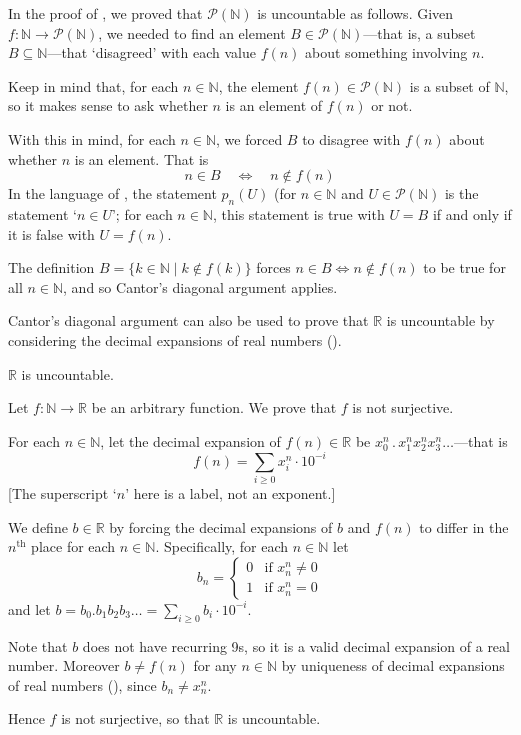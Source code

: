 \begin{example}
In the proof of , we proved that $\mathcal{P}(\mathbb{N})$ is uncountable as follows. Given $f : \mathbb{N} \to \mathcal{P}(\mathbb{N})$, we needed to find an element $B \in \mathcal{P}(\mathbb{N})$---that is, a subset $B \subseteq \mathbb{N}$---that `disagreed' with each value $f(n)$ about something involving $n$.

Keep in mind that, for each $n \in \mathbb{N}$, the element $f(n) \in \mathcal{P}(\mathbb{N})$ is a subset of $\mathbb{N}$, so it makes sense to ask whether $n$ is an element of $f(n)$ or not.

With this in mind, for each $n \in \mathbb{N}$, we forced $B$ to disagree with $f(n)$ about whether $n$ is an element. That is
\[ n \in B \quad \Leftrightarrow \quad n \not\in f(n) \]
In the language of , the statement $p_n(U)$ (for $n \in \mathbb{N}$ and $U \in \mathcal{P}(\mathbb{N})$ is the statement `$n \in U$'; for each $n \in \mathbb{N}$, this statement is true with $U=B$ if and only if it is false with $U=f(n)$.

The definition $B = \{ k \in \mathbb{N} \mid k \not\in f(k) \}$ forces $n \in B \Leftrightarrow n \not\in f(n)$ to be true for all $n \in \mathbb{N}$, and so Cantor's diagonal argument applies.
\end{example}

Cantor's diagonal argument can also be used to prove that $\mathbb{R}$ is uncountable by considering the decimal expansions of real numbers ().

\begin{theorem}
\label{thmRIsUncountable}
$\mathbb{R}$ is uncountable.
\end{theorem}

\begin{cproof}
Let $f : \mathbb{N} \to \mathbb{R}$ be an arbitrary function. We prove that $f$ is not surjective.

For each $n \in \mathbb{N}$, let the decimal expansion of $f(n) \in \mathbb{R}$ be $x_0^n \,.\, x_1^n x_2^n x_3^n \dots$---that is
\[ f(n) = \sum_{i \ge 0} x_i^n \cdot 10^{-i} \]
[The superscript `$n$' here is a label, not an exponent.]

We define $b \in \mathbb{R}$ by forcing the decimal expansions of $b$ and $f(n)$ to differ in the $n^{\text{th}}$ place for each $n \in \mathbb{N}$. Specifically, for each $n \in \mathbb{N}$ let
\[ b_n = \begin{cases} 0 & \text{if } x_n^n \ne 0 \\ 1 & \text{if } x_n^n = 0 \end{cases} \]
and let $b = b_0. b_1 b_2 b_3 \dots{} = \sum_{i \ge 0} b_i \cdot 10^{-i}$.

Note that $b$ does not have recurring 9s, so it is a valid decimal expansion of a real number. Moreover $b \ne f(n)$ for any $n \in \mathbb{N}$ by uniqueness of decimal expansions of real numbers (), since $b_n \ne x_n^n$.

Hence $f$ is not surjective, so that $\mathbb{R}$ is uncountable.
\end{cproof}

